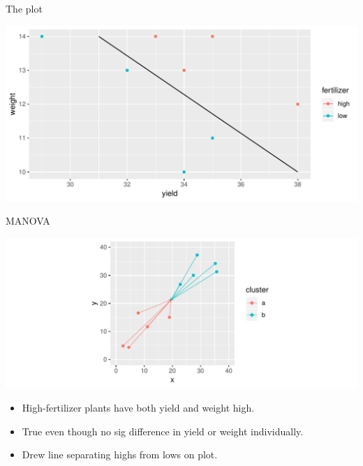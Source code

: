 \begin{frame}[fragile]{The plot}
  
 
\begin{knitrout}
\color{fgcolor}\begin{kframe}
\begin{alltt}
\end{alltt}
\end{kframe}
\includegraphics[width=\maxwidth]{figure/charlecombe-1} 

\end{knitrout}
  
  
\end{frame}

\begin{frame}[fragile]{MANOVA}
  
\begin{knitrout}
\color{fgcolor}\begin{kframe}
\begin{alltt}
\end{alltt}
\end{kframe}
\includegraphics[width=\maxwidth]{figure/unnamed-chunk-6-1} 

\end{knitrout}
  \begin{itemize}
  \item High-fertilizer plants have both yield and weight high.
  \item True even though no sig difference in yield or weight individually.
  \item Drew line separating highs from lows on plot.
  \end{itemize}

 

\end{frame}

